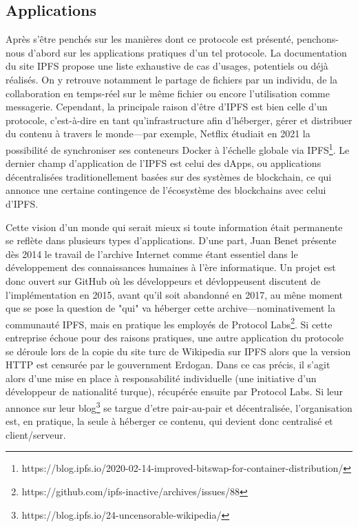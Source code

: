 \documentclass{article}
\begin{document}
\subsection{Applications}

Après s'être penchés sur les manières dont ce protocole est présenté, penchons-nous d'abord sur les applications pratiques d'un tel protocole. La documentation du site IPFS propose une liste exhaustive de cas d'usages, potentiels ou déjà réalisés. On y retrouve notamment le partage de fichiers par un individu, de la collaboration en temps-réel sur le même fichier ou encore l'utilisation comme messagerie. Cependant, la principale raison d'être d'IPFS est bien celle d'un protocole, c'est-à-dire en tant qu'infrastructure afin d'héberger, gérer et distribuer du contenu à travers le monde—par exemple, Netflix étudiait en 2021 la possibilité de synchroniser ses conteneurs Docker à l'échelle globale via IPFS\footnote{https://blog.ipfs.io/2020-02-14-improved-bitswap-for-container-distribution/}. Le dernier champ d'application de l'IPFS est celui des dApps, ou applications décentralisées traditionellement basées sur des systèmes de blockchain, ce qui annonce une certaine contingence de l'écosystème des blockchains avec celui d'IPFS.

Cette vision d'un monde qui serait mieux si toute information était permanente se reflète dans plusieurs types d'applications. D'une part, Juan Benet présente dès 2014 le travail de l'archive Internet comme étant essentiel dans le développement des connaissances humaines à l'ère informatique. Un projet est donc ouvert sur GitHub où les développeurs et dévloppeusent discutent de l'implémentation en 2015, avant qu'il soit abandonné en 2017, au mêne moment que se pose la question de "qui" va héberger cette archive—nominativement la communauté IPFS, mais en pratique les employés de Protocol Labs\footnote{https://github.com/ipfs-inactive/archives/issues/88}. Si cette entreprise échoue pour des raisons pratiques, une autre application du protocole se déroule lors de la copie du site turc de Wikipedia sur IPFS alors que la version HTTP est censurée par le gouvernment Erdogan. Dans ce cas précis, il s'agit alors d'une mise en place à responsabilité individuelle (une initiative d'un développeur de nationalité turque), récupérée ensuite par Protocol Labs. Si leur annonce sur leur blog\footnote{https://blog.ipfs.io/24-uncensorable-wikipedia/} se targue d'etre pair-au-pair et décentralisée, l'organisation est, en pratique, la seule à héberger ce contenu, qui devient donc centralisé et client/serveur.
\end{document}
